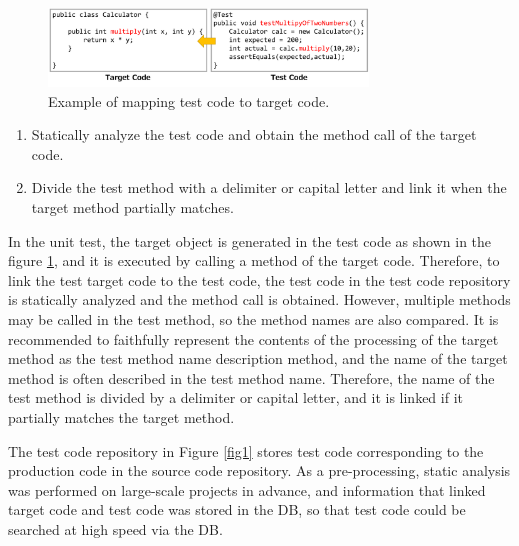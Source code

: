 \documentclass[conference]{IEEEtran}
\begin{document}
\begin{figure}[htbp]
\centerline{\includegraphics[width=8.5cm]{mapping.pdf}}
\caption{Example of mapping test code to target code.}
\label{fig2}
\end{figure}

\begin{enumerate}
\renewcommand{\labelenumi}{(\arabic{enumi})}
\item Statically analyze the test code and obtain the method call of the target code.
\item Divide the test method with a delimiter or capital letter and link it when the target method partially matches.
\end{enumerate}

In the unit test, the target object is generated in the test code as shown in the figure \ref{fig2}, and it is executed by calling a method of the target code. Therefore, to link the test target code to the test code, the test code in the test code repository is statically analyzed and the method call is obtained. However, multiple methods may be called in the test method, so the method names are also compared. It is recommended to faithfully represent the contents of the processing of the target method as the test method name description method, and the name of the target method is often described in the test method name\cite{b22}. Therefore, the name of the test method is divided by a delimiter or capital letter, and it is linked if it partially matches the target method.

The test code repository in Figure \ref{fig1} stores test code corresponding to the production code in the source code repository. As a pre-processing, static analysis was performed on large-scale projects in advance, and information that linked target code and test code was stored in the DB, so that test code could be searched at high speed via the DB.
\end{document}
